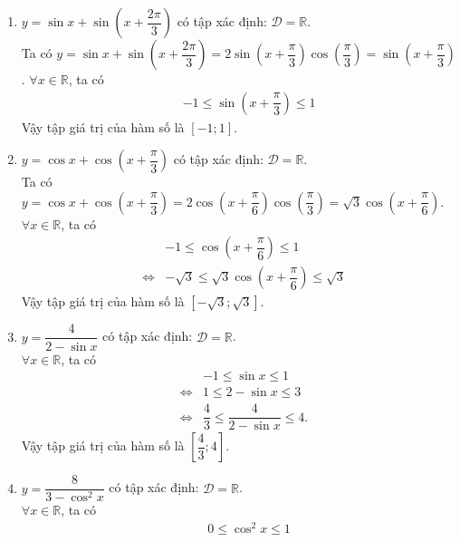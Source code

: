\begin{bt}
{\begin{enumerate}
\begin{eqnarray*}
			&\Leftrightarrow& 0 \leq -\dfrac{1}{2}\sin ^{2} 2x \leq -\dfrac{1}{2}\\
			&\Leftrightarrow& 1+0 \geq 1-\dfrac{1}{2}\sin ^{2} 2x \geq 1-\dfrac{1}{2}\\
			&\Leftrightarrow& 1 \geq y \geq \dfrac{1}{2}.
		\end{eqnarray*}
		Vậy tập giá trị của hàm số là $\left[\dfrac{1}{2};1\right]$.
		\item $y=\sin x+\sin (x+\dfrac{2\pi}{3})$ có tập xác định: $\mathscr{D}=\mathbb{R}$.\\
		Ta có $y=\sin x+\sin (x+\dfrac{2\pi}{3})=2\sin \left(x+\dfrac{\pi}{3}\right)\cos \left(\dfrac{\pi}{3}\right)=\sin \left(x+\dfrac{\pi}{3}\right)$.
		$\forall x \in \mathbb{R}$, ta có
		\begin{eqnarray*}
			&&-1 \leq \sin \left(x+\dfrac{\pi}{3}\right) \leq 1
		\end{eqnarray*}
		Vậy tập giá trị của hàm số là $[-1;1]$.
		\item $y=\cos x+\cos (x+\dfrac{\pi}{3})$ có tập xác định: $\mathscr{D}=\mathbb{R}$.\\
		Ta có $y=\cos x+\cos (x+\dfrac{\pi}{3})=2\cos \left(x+\dfrac{\pi}{6}\right)\cos \left(\dfrac{\pi}{3}\right)=\sqrt{3}\cos \left(x+\dfrac{\pi}{6}\right)$.
		$\forall x \in \mathbb{R}$, ta có
		\begin{eqnarray*}
			&&-1 \leq \cos \left(x+\dfrac{\pi}{6}\right) \leq 1\\
			&\Leftrightarrow& -\sqrt{3} \leq \sqrt{3}\cos \left(x+\dfrac{\pi}{6}\right) \leq \sqrt{3}
		\end{eqnarray*}
		Vậy tập giá trị của hàm số là $\left[-\sqrt{3};\sqrt{3}\right]$.
		\item $y=\dfrac{4}{2-\sin x}$ có tập xác định: $\mathscr{D}=\mathbb{R}$.\\
		$\forall x \in \mathbb{R}$, ta có
		\begin{eqnarray*}
			&&-1 \leq \sin x \leq 1\\
			&\Leftrightarrow& 1 \leq 2-\sin x \leq 3\\
			&\Leftrightarrow& \dfrac{4}{3} \leq \dfrac{4}{2-\sin x} \leq 4.
		\end{eqnarray*}
		Vậy tập giá trị của hàm số là $\left[\dfrac{4}{3};4\right]$.
		\item $y=\dfrac{8}{3-\cos ^{2} x}$ có tập xác định: $\mathscr{D}=\mathbb{R}$.\\
		$\forall x \in \mathbb{R}$, ta có
		\begin{eqnarray*}
			&&0 \leq \cos ^{2} x \leq 1\\

\end{eqnarray*}
\end{enumerate}}
\end{bt}
